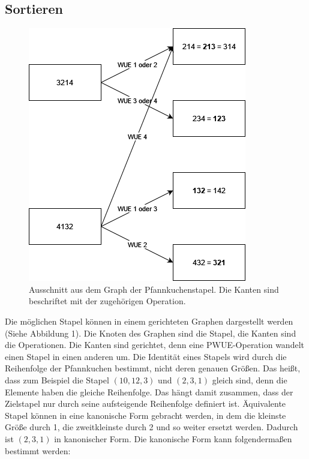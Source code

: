 \documentclass[a4paper,10pt,ngerman]{scrartcl}
\begin{document}
\subsection{Sortieren}
\begin{figure}[t]
  \includegraphics[scale=0.5]{pancakegraph}
  \centering
  \caption{Ausschnitt aus dem Graph der Pfannkuchenstapel. Die Kanten sind beschriftet mit der zugehörigen Operation.}
\end{figure}
Die möglichen Stapel können in einem gerichteten Graphen dargestellt werden (Siehe Abbildung 1). Die Knoten des Graphen
sind die Stapel, die Kanten sind die Operationen. Die Kanten sind gerichtet, denn eine PWUE-Operation
wandelt einen Stapel in einen anderen um. Die Identität eines Stapels wird durch die Reihenfolge der Pfannkuchen bestimmt,
nicht deren genauen Größen. Das heißt, dass zum Beispiel die Stapel $(10,12,3)$ und $(2,3,1)$ gleich sind, denn die Elemente haben die gleiche
Reihenfolge. Das hängt damit zusammen, dass der Zielstapel nur durch seine aufsteigende Reihenfolge definiert ist. Äquivalente Stapel können
in eine kanonische Form gebracht werden, in dem die kleinste Größe durch 1, die zweitkleinste durch 2 und so weiter ersetzt werden. Dadurch ist
$(2,3,1)$ in kanonischer Form. Die kanonische Form kann folgendermaßen bestimmt werden:
\begin{algorithmic}
  \EndFor

  \EndIf
  \EndFor
  \EndFor

  \EndProcedure
\end{algorithmic}
\end{document}
